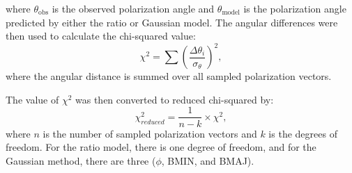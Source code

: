 \noindent where $\theta_{\text{obs}}$ is the observed polarization angle and $\theta_{\text{model}}$ is the polarization angle predicted by either the ratio or Gaussian model. The angular differences were then used to calculate the chi-squared value:
\begin{equation}
    \chi^2 = \sum \left(\frac{\Delta \theta_i}{\sigma_\theta}\right)^2,
    \label{eq: chi_sq}
\end{equation}
\noindent where the angular distance is summed over all sampled polarization vectors. 

The value of $\chi^2$ was then converted to reduced chi-squared by:
\begin{equation}
    \chi^2_{reduced} = \frac{1}{n-k} \times \chi^2,
    \label{eq: chi_sq_reduced}
\end{equation}
\noindent where $n$ is the number of sampled polarization vectors and $k$ is the degrees of freedom. For the ratio model, there is one degree of freedom, and for the Gaussian method, there are three ($\phi$, BMIN, and BMAJ). 




